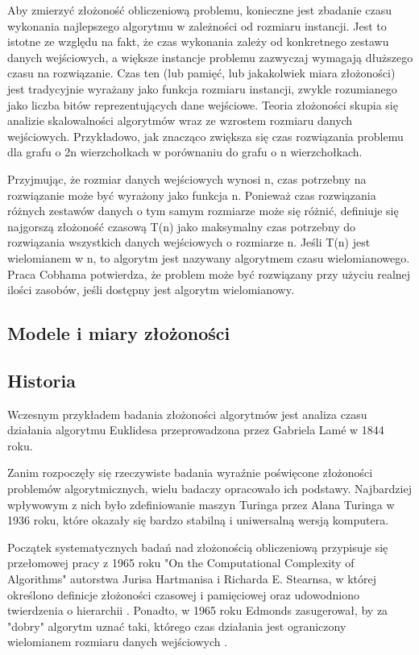 Aby zmierzyć złożoność obliczeniową problemu, konieczne jest zbadanie czasu wykonania najlepszego algorytmu w zależności od rozmiaru instancji. Jest to istotne ze względu na fakt, że czas wykonania zależy od konkretnego zestawu danych wejściowych, a większe instancje problemu zazwyczaj wymagają dłuższego czasu na rozwiązanie. Czas ten (lub pamięć, lub jakakolwiek miara złożoności) jest tradycyjnie wyrażany jako funkcja rozmiaru instancji, zwykle rozumianego jako liczba bitów reprezentujących dane wejściowe. Teoria złożoności skupia się analizie skalowalności algorytmów wraz ze wzrostem rozmiaru danych wejściowych. Przykładowo, jak znacząco zwiększa się czas rozwiązania problemu dla grafu o 2n wierzchołkach w porównaniu do grafu o n wierzchołkach.

Przyjmując, że rozmiar danych wejściowych wynosi n, czas potrzebny na rozwiązanie może być wyrażony jako funkcja n.  Ponieważ czas rozwiązania różnych zestawów danych o tym samym rozmiarze może się różnić, definiuje się najgorszą złożoność czasową T(n) jako maksymalny czas potrzebny do rozwiązania wszystkich danych wejściowych o rozmiarze n.  Jeśli T(n) jest wielomianem w n, to algorytm jest nazywany algorytmem czasu wielomianowego. Praca Cobhama potwierdza, że problem może być rozwiązany przy użyciu realnej ilości zasobów, jeśli dostępny jest algorytm wielomianowy.

	\subsection{Modele i miary złożoności}

	\subsection{Historia}

Wczesnym przykładem badania złożoności algorytmów jest analiza czasu działania algorytmu Euklidesa przeprowadzona przez Gabriela Lamé w 1844 roku.

Zanim rozpoczęły się rzeczywiste badania wyraźnie poświęcone złożoności problemów algorytmicznych, wielu badaczy opracowało ich podstawy. Najbardziej wpływowym z nich było zdefiniowanie maszyn Turinga przez Alana Turinga w 1936 roku, które okazały się bardzo stabilną i uniwersalną wersją komputera.

Początek systematycznych badań nad złożonością obliczeniową przypisuje się przełomowej pracy z 1965 roku "On the Computational Complexity of Algorithms" autorstwa Jurisa Hartmanisa i Richarda E. Stearnsa, w której określono definicje złożoności czasowej i pamięciowej oraz udowodniono twierdzenia o hierarchii \cite{FortnowH03}. Ponadto, w 1965 roku Edmonds zasugerował, by za "dobry" algorytm uznać taki, którego czas działania jest ograniczony wielomianem rozmiaru danych wejściowych \cite{Karp86}.

